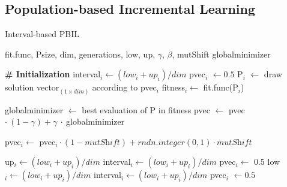 \subsection{Population-based Incremental Learning}
\begin{algorithm}
	\singlespacing
	\caption{Interval-based PBIL} \label{PBIL}
	\begin{algorithmic}[1]
		\INPUT fit.func, Psize, dim, generations, low, up, $\gamma$, $\beta$, mutShift
		\OUTPUT globalminimizer
		
		\noindent \Statex \hrulefill
		\Statex \textbf{\# Initialization}
		\State interval$_i \gets (low_i + up_i)/dim$ 
		\State pvec$_i$ $\gets 0.5$
		\State P$_i$ $\gets$ draw solution vector$_{(1\times dim)}$ according to pvec$_i$
		\State fitness$_i \gets$ fit.func(P$_i$)
		\EndFor
		
		\Statex
		\State globalminimizer $\gets$ best evaluation of P in fitness
		\State pvec $\gets$ pvec $\cdot \: (1-\gamma) + \gamma \: \cdot \:$globalminimizer
		
		\State pvec$_i \gets$ pvec$_i \cdot (1-\textit{mutShift}) + \textit{rndn.integer}(0,1) \cdot \textit{mutShift}$
		\EndIf
		
		\State up$_i \gets (low_i + up_i)/dim$
		\State interval$_i \gets (low_i + up_i)/dim$
		\State pvec$_i \gets$ 0.5
		\State low$_i \gets (low_i + up_i)/dim $
		\State interval$_i \gets (low_i + up_i)/dim$
		\State pvec$_i$ $\gets 0.5$ \EndIf
		\EndFor
		\EndFor
		
	\end{algorithmic}
\end{algorithm}

\newpage
